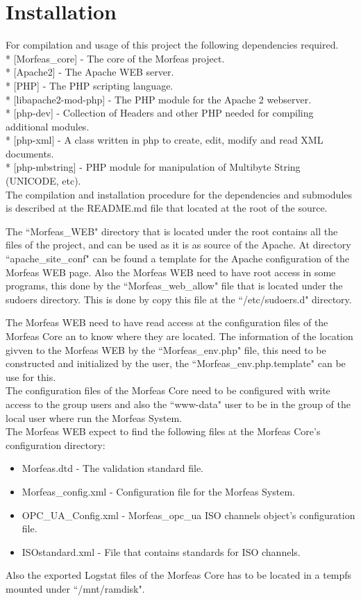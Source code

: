 \section{Installation}
For compilation and usage of this project the following dependencies required.\\
* [Morfeas\_core] - The core of the Morfeas project.\\
* [Apache2] - The Apache WEB server.\\
* [PHP] - The PHP scripting language.\\
* [libapache2-mod-php] - The PHP module for the Apache 2 webserver.\\
* [php-dev] - Collection of Headers and other PHP needed for compiling additional modules.\\
* [php-xml] -  A class written in php to create, edit, modify and read XML documents.\\
* [php-mbstring] - PHP module for manipulation of Multibyte String (UNICODE, etc).\\

The compilation and installation procedure for the dependencies and submodules is described at the README.md file that located at the root of the source.

The ``Morfeas\_WEB" directory that is located under the root contains all the files of the project, and can be used as it is as source of the Apache.
At directory ``apache\_site\_conf" can be found a template for the Apache configuration of the Morfeas WEB page.
Also the Morfeas WEB need to have root access in some programs, this done by the ``Morfeas\_web\_allow" file that is located under the sudoers directory.
This is done by copy this file at the ``/etc/sudoers.d" directory.

The Morfeas WEB need to have read access at the configuration files of the Morfeas Core an to know where they are located. The information of the location givven to the
Morfeas WEB by the ``Morfeas\_env.php" file, this need to be constructed and initialized by the user, the ``Morfeas\_env.php.template" can be use for this.\\
The configuration files of the Morfeas Core need to be configured with write access to the group users
and also the ``www-data" user to be in the group of the local user where run the Morfeas System.\\
The Morfeas WEB expect to find the following files at the Morfeas Core's configuration directory:
\begin{itemize}
	\item Morfeas.dtd - The validation standard file.
	\item Morfeas\_config.xml - Configuration file for the Morfeas System.
	\item OPC\_UA\_Config.xml - Morfeas\_opc\_ua ISO channels object's configuration file.
	\item ISOstandard.xml - File that contains standards for ISO channels.
\end{itemize}
Also the exported Logstat files of the Morfeas Core has to be located in a tempfs mounted under ``/mnt/ramdisk".